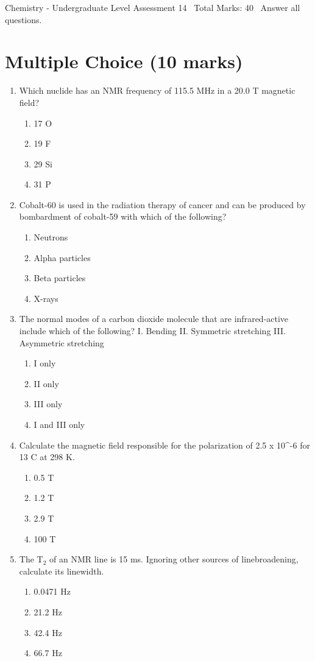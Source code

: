 \documentclass[12pt]{article}
\begin{document}
\begin{center}
Chemistry - Undergraduate Level Assessment 14 \
Total Marks: 40 \
Answer all questions.
\end{center}

\section*{Multiple Choice (10 marks)}
\begin{enumerate}[label=\arabic*.]
\item Which nuclide has an NMR frequency of 115.5 MHz in a 20.0 T magnetic field?
\begin{enumerate}[label=(\alph*)]
    \item 17 O
    \item 19 F
    \item 29 Si
    \item 31 P
\end{enumerate}
\item Cobalt-60 is used in the radiation therapy of cancer and can be produced by bombardment of cobalt-59 with which of the following?
\begin{enumerate}[label=(\alph*)]
    \item Neutrons
    \item Alpha particles
    \item Beta particles
    \item X-rays
\end{enumerate}
\item The normal modes of a carbon dioxide molecule that are infrared-active include which of the following? I. Bending II. Symmetric stretching III. Asymmetric stretching
\begin{enumerate}[label=(\alph*)]
    \item I only
    \item II only
    \item III only
    \item I and III only
\end{enumerate}
\item Calculate the magnetic field responsible for the polarization of 2.5 x 10^-6 for 13 C at 298 K.
\begin{enumerate}[label=(\alph*)]
    \item 0.5 T
    \item 1.2 T
    \item 2.9 T
    \item 100 T
\end{enumerate}
\item The T$_{2}$ of an NMR line is 15 ms. Ignoring other sources of linebroadening, calculate its linewidth.
\begin{enumerate}[label=(\alph*)]
    \item 0.0471 Hz
    \item 21.2 Hz
    \item 42.4 Hz
    \item 66.7 Hz
\end{enumerate}
\end{enumerate}
\end{document}
